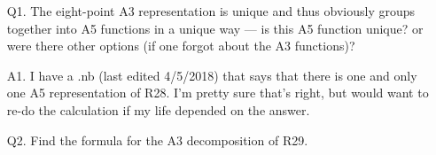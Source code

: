 \documentclass[12pt]{article}
\begin{document}
\thispagestyle{fancyplain}
 
\fancyhf{}
 
\cfoot{\fancyplain{}{\thepage}}


\begin{itemize}
	\item[Q1.] The eight-point A3 representation is unique and thus obviously groups together into A5 functions in a unique way — is this A5 function unique? or were there other options (if one forgot about the A3 functions)?
	\item[A1.] I have a .nb (last edited 4/5/2018) that says that there is one and only one A5 representation of R28. I'm pretty sure that's right, but would want to re-do the calculation if my life depended on the answer.\\
	
	\item[Q2.] Find the formula for the A3 decomposition of R29.


\end{itemize}
\end{document}
